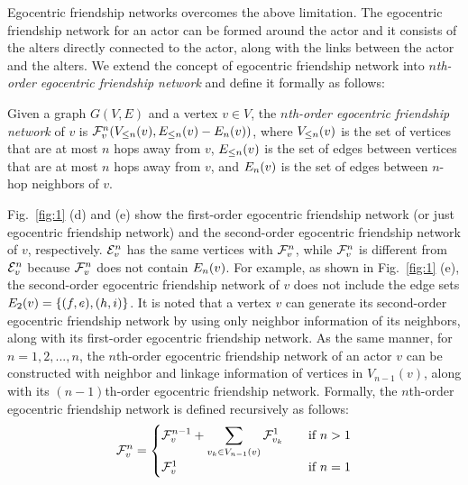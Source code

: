 Egocentric friendship networks overcomes the above limitation. 
The egocentric friendship network for an actor can be formed around the actor and it consists of the alters directly connected to the actor, along with the links between the actor and the alters. 
We extend the concept of egocentric friendship network into \emph{$n$th-order egocentric friendship network} and define it formally as follows:  
\begin{definition}\label{def:multi-order-friendship-network}
Given a graph $G(V, E)$ and a vertex $v \in V$, the \emph{$n$th-order egocentric friendship network} of $v$ is $\FNN{v}{n}(\LV{v}{n}, \LE{v}{n} - \E{v}{n})$, where $\LV{v}{n}$ is the set of vertices that are at most $n$ hops away from $v$, $\LE{v}{n}$ is the set of edges between vertices that are at most $n$ hops away from $v$, and $\E{v}{n}$ is the set of edges between $n$-hop neighbors of $v$.
\end{definition}
Fig.~\ref{fig:1} (d) and (e) show the first-order egocentric friendship network (or just egocentric friendship network) and the second-order egocentric friendship network of $v$, respectively. 
$\ENN{v}{n}$ has the same vertices with $\FNN{v}{n}$, while $\FNN{v}{n}$ is different from $\ENN{v}{n}$ because $\FNN{v}{n}$ does not contain $\E{v}{n}$. 
For example, as shown in Fig.~\ref{fig:1} (e), the second-order egocentric friendship network of $v$ does not include the edge sets $\E{v}{2}=\{ (f, e), (h, i) \}$. It is noted that a vertex $v$ can generate its second-order egocentric friendship network by using only neighbor information of its neighbors, along with its first-order egocentric friendship network. As the same manner, for $n=1, 2, ..., n$, the $n$th-order egocentric friendship network of an actor $v$ can be constructed with neighbor and linkage information of vertices in $V_{n-1} (v)$, along with its $(n-1)$th-order egocentric friendship network. Formally, the $n$th-order egocentric friendship network is defined recursively as follows:
\begin{eqnarray}
\displaystyle
\FNN{v}{n} = 
\begin{cases}
    \displaystyle
 	\FNN{v}{n-1} + \sum_{ v_k \in V_{n-1} (v)} \FNN{v_k}{1}       & \quad \text{if } n > 1\\
    \FNN{v}{1}  & \quad \text{if } n = 1
\end{cases}
\end{eqnarray}

